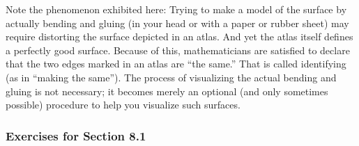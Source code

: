 \documentclass{book}
\begin{document}
Note the phenomenon exhibited here: Trying to make a model of the
surface by actually bending and gluing (in your head or with a paper
or rubber sheet) may require distorting the surface depicted in an atlas.
And yet the atlas itself defines a perfectly good surface. Because of this,
mathematicians are satisfied to declare that the two edges marked in
an atlas are ``the same.'' That is called identifying (as in ``making the
same''). The process of visualizing the actual bending and gluing is not
necessary; it becomes merely an optional (and only sometimes possible)
procedure to help you visualize such surfaces.

\subsubsection{Exercises for Section 8.1}
\end{document}
